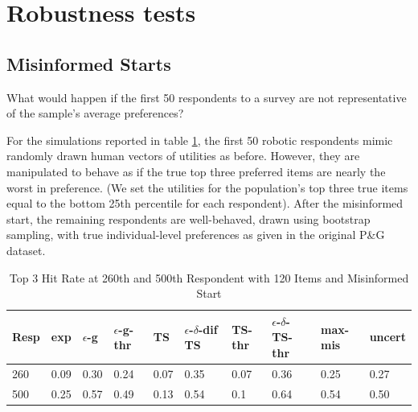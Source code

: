 \documentclass[nonblindrev]{informs3}
\newcommand{\alexander}[1]{\textcolor{blue}{\textbf{(alexander)} #1}}
\newcommand{\eric}[1]{\textcolor{red}{\textbf{(eric)} #1}}
\newcommand{\fixedexpressS}{\textbf{exp}}
\newcommand{\egreedyS}{$\epsilon$-\textbf{g}}
\newcommand{\egreedythresS}{$\epsilon$-\textbf{g-thr}}
\newcommand{\misminS}{\textbf{max-mis}}
\newcommand{\tsS}{\textbf{TS} }
\newcommand{\edtsS}{$\epsilon$-$\delta$-\textbf{dif TS} }
\newcommand{\tsthresS}{\textbf{TS-thr} }
\newcommand{\edtsthresS}{$\epsilon$-$\delta$-\textbf{TS-thr} }
\newcommand{\uncertS}{\textbf{uncert} }
\begin{document}


\section{Robustness tests} \label{sec:robust}

\subsection{Misinformed Starts}


What would happen if the first 50 respondents to a survey are not representative of the sample's average preferences?

For the simulations reported in table \ref{table:120mis}, the first 50 robotic respondents mimic randomly drawn human vectors of utilities as before. However, they are manipulated to behave as if the true top three preferred items are nearly the worst in preference. (We set the utilities for the population's top three true items equal to the bottom 25th percentile for each respondent).  After the misinformed start, the remaining respondents are well-behaved, drawn using bootstrap sampling, with true individual-level preferences as given in the original P\&G dataset.

\begin{table}
\caption{Top 3 Hit Rate at 260th and 500th Respondent with 120 Items and Misinformed Start}
\begin{tabular}{llllllllll}
\hline   Resp &  \fixedexpressS&\egreedyS&\egreedythresS&\tsS&\edtsS&\tsthresS&\edtsthresS& \misminS& \uncertS   \\ \hline    260 &   0.09 &   0.30 & 0.24 & 0.07  & 0.35 & 0.07 &  0.36 & 0.25 &   0.27 \\
  500 &  0.25 &   0.57 &  0.49 &  0.13 & 0.54 &   0.1 &    0.64 & 0.54 &  0.50  \end{tabular}
\begin{center}
\label{table:120mis}
\end{center}
\end{table}
\end{document}

